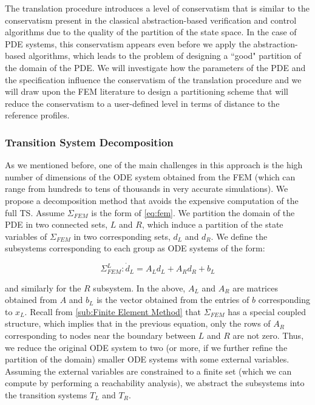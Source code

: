 \documentclass{article}
\begin{document}
The translation procedure introduces a level of conservatism that is similar to
the conservatism present in the classical abstraction-based verification and
control algorithms due to the quality of the partition of the state space. In
the case of PDE systems, this conservatism appears even before we apply the
abstraction-based algorithms, which leads to the problem of designing a ``good"
partition of the domain of the PDE. We will investigate how the parameters of
the PDE and the specification influence the conservatism of the translation
procedure and we will
draw upon the FEM literature to design a partitioning scheme that will reduce
the conservatism to a user-defined level in terms of distance to the reference
profiles.

\subsubsection{Transition System Decomposition}
\label{ssub:Transition System Decomposition}

As we mentioned before, one of the main challenges in this approach is the high
number of dimensions of the ODE system obtained from the FEM (which can range
from hundreds to tens of thousands in very accurate simulations). We propose a
decomposition method that avoids the expensive computation of the full
TS. Assume $\Sigma_{FEM}$ is the form of \cref{eq:fem}. We partition the domain
of the PDE in two connected sets, $L$ and $R$, which induce a partition of the state 
variables of $\Sigma_{FEM}$ in two corresponding sets, $d_L$
and $d_R$. We define the subsystems corresponding to each group as ODE systems
of the form:

\begin{equation}
    \Sigma^{L}_{FEM} : \dot{d}_L = A_L d_L + A_R d_R + b_L
\end{equation}

and similarly for the $R$ subsystem. In the above, $A_L$ and $A_R$ are matrices 
obtained from $A$
and $b_L$ is the vector obtained from the entries of $b$ corresponding to $x_L$.
Recall from \cref{sub:Finite Element Method} that $\Sigma_{FEM}$ has a special
coupled structure, which implies that in the previous equation, only the rows of $A_R$
corresponding to nodes near the boundary between $L$ and $R$ are not zero. Thus,
we reduce the original ODE system to two (or more, if we further refine the
partition of the domain) smaller ODE systems with some external variables.
Assuming the external variables are constrained to a finite set (which we can
compute by performing a reachability analysis), we abstract
the subsystems into the transition systems $T_L$ and $T_R$.
\end{document}
